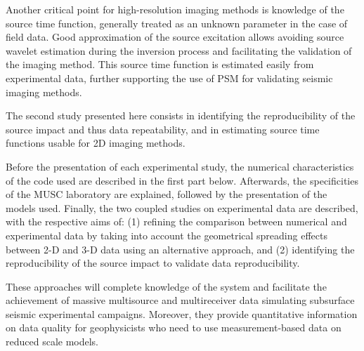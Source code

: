 \documentclass[manuscript,revised]{geophysics}
\newcommand{\twod}{2-D }
\newcommand{\thrd}{3-D }
\begin{document}
\noindent Another critical point for high-resolution imaging methods is knowledge of the source time function, generally treated as an unknown parameter in the case of field data. Good approximation of the source excitation allows avoiding source wavelet estimation during the inversion process and facilitating the validation of the imaging method. This source time function is estimated easily from experimental data, further supporting the use of PSM for validating seismic imaging methods.



\noindent The second study presented here consists in identifying the reproducibility of the source impact and thus data repeatability, and in estimating source time functions usable for 2D imaging methods.



\noindent Before the presentation of each experimental study, the numerical characteristics of the code used are described in the first part below. Afterwards, the specificities of the MUSC laboratory are explained, followed by the presentation of the models used. Finally, the two coupled studies on experimental data are described, with the respective aims of: (1) refining the comparison between numerical and experimental data by taking into account the geometrical spreading effects between \twod and \thrd data using an alternative approach, and (2) identifying the reproducibility of the source impact to validate data reproducibility.

\noindent These approaches will complete knowledge of the system and facilitate the achievement of massive multisource and multireceiver data simulating subsurface seismic experimental campaigns. Moreover, they provide quantitative information on data quality for geophysicists who need to use measurement-based data on reduced scale models. 

\end{document}
